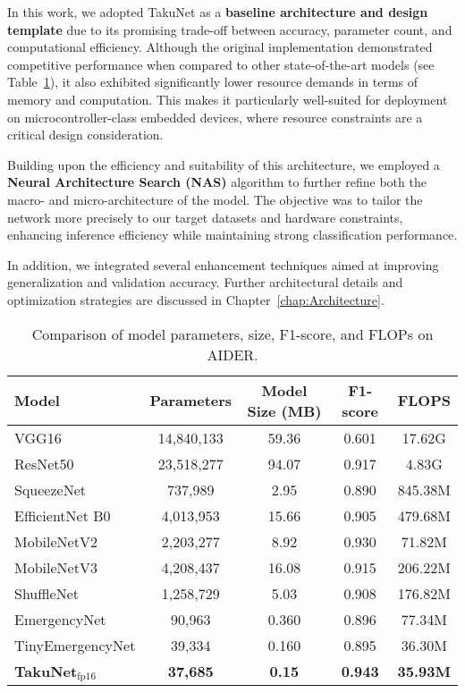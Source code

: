 In this work, we adopted TakuNet as a \textbf{baseline architecture and design template} due to its promising trade-off between accuracy, parameter count, and computational efficiency. Although the original implementation demonstrated competitive performance when compared to other state-of-the-art models (see Table~\ref{tab:model_comparison}), it also exhibited significantly lower resource demands in terms of memory and computation. This makes it particularly well-suited for deployment on microcontroller-class embedded devices, where resource constraints are a critical design consideration.

Building upon the efficiency and suitability of this architecture, we employed a \textbf{Neural Architecture Search (NAS)} algorithm to further refine both the macro- and micro-architecture of the model. The objective was to tailor the network more precisely to our target datasets and hardware constraints, enhancing inference efficiency while maintaining strong classification performance.


In addition, we integrated several enhancement techniques aimed at improving generalization and validation accuracy. Further architectural details and optimization strategies are discussed in Chapter~\ref{chap:Architecture}.



\begin{table}[h!]
\centering
\begin{tabular}{lcccc}
\hline
\textbf{Model} & \textbf{Parameters} & \textbf{Model Size (MB)} & \textbf{F1-score} & \textbf{FLOPS} \\
\hline
VGG16 \cite{simonyan2014very} & 14,840,133 & 59.36 & 0.601 & 17.62G \\
ResNet50 \cite{he2016deep} & 23,518,277 & 94.07 & 0.917 & 4.83G \\
SqueezeNet \cite{iandola2016squeezenet} & 737,989 & 2.95 & 0.890 & 845.38M \\
EfficientNet B0 \cite{tan2019efficientnet} & 4,013,953 & 15.66 & 0.905 & 479.68M \\
MobileNetV2 \cite{sandler2018mobilenetv2} & 2,203,277 & 8.92 & 0.930 & 71.82M \\
MobileNetV3 \cite{howard2019searching} & 4,208,437 & 16.08 & 0.915 & 206.22M \\
ShuffleNet \cite{zhang2018shufflenet} & 1,258,729 & 5.03 & 0.908 & 176.82M \\
EmergencyNet \cite{emergencynet} & 90,963 & 0.360 & 0.896 & 77.34M \\
TinyEmergencyNet \cite{tinyemergencynet} & 39,334 & 0.160 & 0.895 & 36.30M \\
\textbf{TakuNet$_\text{fp16}$} & \textbf{37,685} & \textbf{0.15} & \textbf{0.943} & \textbf{35.93M} \\
\hline
\end{tabular}
\caption{Comparison of model parameters, size, F1-score, and FLOPs on AIDER.}
\label{tab:model_comparison}
\end{table}


